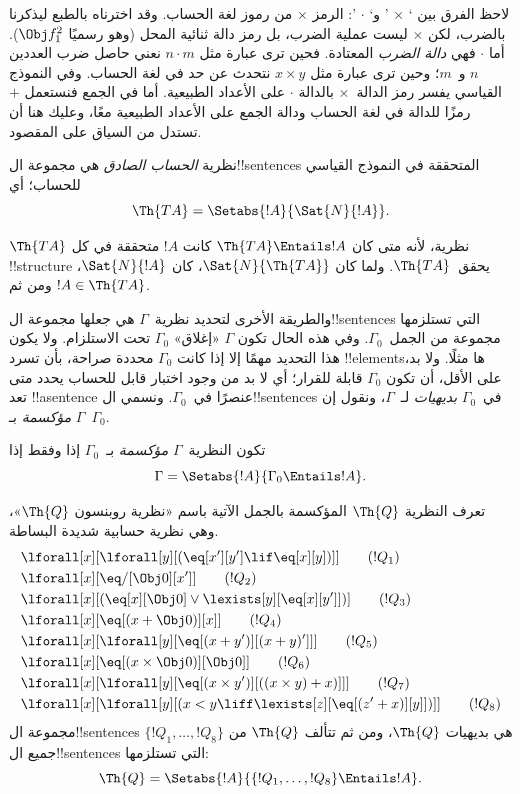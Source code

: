 \documentclass[../../../include/open-logic-section]{subfiles}
\begin{document}
لاحظ الفرق بين ` $\times$ ' و` $\cdot$ ': الرمز $\times$ من رموز
لغة الحساب. وقد اخترناه بالطبع ليذكرنا بالضرب، لكن $\times$ ليست
عملية الضرب، بل رمز دالة ثنائية المحل (وهو رسميًا $\Obj f^2_1$).
أما $\cdot$ فهي \emph{دالة الضرب} المعتادة. فحين ترى عبارة مثل
$n\cdot m$ نعني حاصل ضرب العددين $n$ و~$m$؛ وحين ترى عبارة مثل
$x\times y$ نتحدث عن حد في لغة الحساب. وفي النموذج القياسي يفسر رمز
الدالة~$\times$ بالدالة $\cdot$ على الأعداد الطبيعية. أما في الجمع
فنستعمل $+$ رمزًا للدالة في لغة الحساب ودالة الجمع على الأعداد
الطبيعية معًا، وعليك هنا أن تستدل من السياق على المقصود.

\begin{defn}
نظرية \emph{الحساب الصادق} هي مجموعة ال!!{sentence}s المتحققة في
النموذج القياسي للحساب؛ أي
\[
\Th{TA} = \Setabs{!A}{\Sat{N}{!A}}.
\]
\end{defn}

$\Th{TA}$ نظرية، لأنه متى كان $\Th{TA}\Entails !A$ كانت $!A$
متحققة في كل !!{structure} يحقق~$\Th{TA}$. ولما كان
$\Sat{N}{\Th{TA}}$، كان $\Sat{N}{!A}$، ومن ثم $!A\in\Th{TA}$.

والطريقة الأخرى لتحديد نظرية~$\Gamma$ هي جعلها مجموعة ال!!{sentence}s
التي تستلزمها مجموعة من الجمل~$\Gamma_0$. وفي هذه الحال تكون $\Gamma$
«إغلاق» $\Gamma_0$ تحت الاستلزام. ولا يكون هذا التحديد مهمًا إلا إذا
كانت $\Gamma_0$ محددة صراحة، بأن تسرد !!{element}sها مثلًا. ولا بد،
على الأقل، أن تكون $\Gamma_0$ قابلة للقرار؛ أي لا بد من وجود اختبار
قابل للحساب يحدد متى تعد !!a{sentence} عنصرًا في~$\Gamma_0$. ونسمي
ال!!{sentence}s في~$\Gamma_0$ \emph{بديهيات} لـ~$\Gamma$، ونقول إن
$\Gamma$ \emph{مؤكسمة} بـ~$\Gamma_0$.

\begin{defn}
تكون النظرية~$\Gamma$ \emph{مؤكسمة} بـ~$\Gamma_0$ إذا وفقط إذا
\[
\Gamma = \Setabs{!A}{\Gamma_0 \Entails !A}.
\]
\end{defn}

\begin{defn}
تعرف النظرية $\Th{Q}$ المؤكسمة بالجمل الآتية باسم «نظرية روبنسون
$\Th{Q}$»، وهي نظرية حسابية شديدة البساطة.
\begin{align*}
& \lforall[x][\lforall[y][(\eq[x'][y'] \lif \eq[x][y])]] \tag{$!Q_1$}\\
& \lforall[x][\eq/[\Obj 0][x']] \tag{$!Q_2$}\\
& \lforall[x][(\eq[x][\Obj 0] \lor \lexists[y][\eq[x][y']])] \tag{$!Q_3$}\\
& \lforall[x][\eq[(x + \Obj 0)][x]] \tag{$!Q_4$}\\
& \lforall[x][\lforall[y][\eq[(x + y')][(x + y)']]] \tag{$!Q_5$}\\
& \lforall[x][\eq[(x \times \Obj 0)][\Obj 0]] \tag{$!Q_6$}\\
& \lforall[x][\lforall[y][\eq[(x \times y')][((x \times y) + x)]]] \tag{$!Q_7$}\\
& \lforall[x][\lforall[y][(x < y \liff \lexists[z][\eq[(z' + x)][y]])]] \tag{$!Q_8$}
\end{align*}
مجموعة ال!!{sentence}s $\{!Q_1,\dots,!Q_8\}$ هي بديهيات $\Th{Q}$،
ومن ثم تتألف $\Th{Q}$ من جميع ال!!{sentence}s التي تستلزمها:
\[
\Th{Q} = \Setabs{!A}{\{!Q_1, \dots, !Q_8\} \Entails !A}.
\]
\end{defn}
\end{document}
